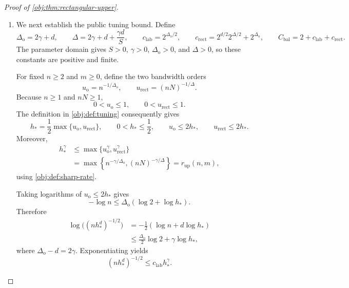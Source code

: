 \begin{proof}[Proof of \cref{obj:thm:rectangular-upper}]
\begin{enumerate}
\item We next establish the public tuning bound. Define
\[
\Delta_{\mathrm{o}}=2\gamma+d,\qquad
\Delta=2\gamma+d+\frac{\gamma d}{S},
\qquad
c_{\mathrm{lab}}=2^{\Delta_{\mathrm{o}}/2},
\qquad
c_{\mathrm{rect}}
=2^{d/2}2^{\Delta/2}+2^{\Delta_{\mathrm{o}}},
\qquad
C_{\mathrm{bal}}=2+c_{\mathrm{lab}}+c_{\mathrm{rect}}.
\]
The parameter domain gives \(S>0\), \(\gamma>0\),
\(\Delta_{\mathrm{o}}>0\), and \(\Delta>0\), so these constants are positive and finite.

For fixed \(n\ge2\) and \(m\ge0\), define the two bandwidth orders
\[
u_{\mathrm{o}}=n^{-1/\Delta_{\mathrm{o}}},
\qquad
u_{\mathrm{rect}}=(nN)^{-1/\Delta}.
\]
Because \(n\ge1\) and \(nN\ge1\),
\[
0<u_{\mathrm{o}}\le1,\qquad
0<u_{\mathrm{rect}}\le1.
\]
The definition in \cref{obj:def:tuning} consequently gives
\[
h_*=\frac12\max\{u_{\mathrm{o}},u_{\mathrm{rect}}\},
\qquad
0<h_*\le\frac12,\qquad
u_{\mathrm{o}}\le2h_*,
\qquad
u_{\mathrm{rect}}\le2h_*.
\]
Moreover,
\[
\begin{aligned}
h_*^\gamma
&\le \max\{u_{\mathrm{o}}^\gamma,u_{\mathrm{rect}}^\gamma\}\\
&=\max\left\{
 n^{-\gamma/\Delta_{\mathrm{o}}},
 (nN)^{-\gamma/\Delta}\right\}
=r_{\mathrm{up}}(n,m),
\end{aligned}
\]
using \cref{obj:def:sharp-rate}.

Taking logarithms of \(u_{\mathrm{o}}\le2h_*\) gives
\[
-\log n
\le\Delta_{\mathrm{o}}(\log2+\log h_*).
\]
Therefore
\[
\begin{aligned}
\log\bigl((nh_*^d)^{-1/2}\bigr)
&=-\frac12(\log n+d\log h_*)\\
&\le\frac{\Delta_{\mathrm{o}}}{2}\log2
   +\gamma\log h_*,
\end{aligned}
\]
where \(\Delta_{\mathrm{o}}-d=2\gamma\). Exponentiating yields
\[
(nh_*^d)^{-1/2}\le c_{\mathrm{lab}}h_*^\gamma.
\]%


\end{enumerate}
\end{proof}
